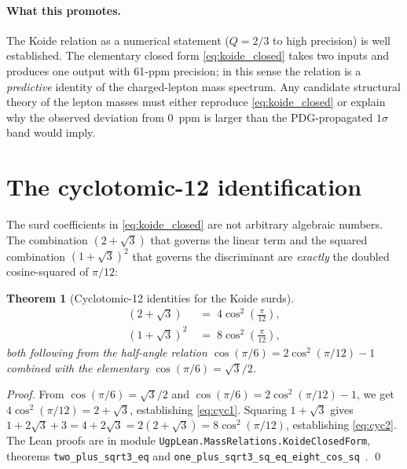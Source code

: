 \documentclass[11pt]{article}
\newtheorem{theorem}{Theorem}[section]
\theoremstyle{remark}
\begin{document}
\paragraph{What this promotes.}
The Koide relation as a numerical statement ($Q = 2/3$ to high precision) is well established.  The elementary closed form \eqref{eq:koide_closed} takes two inputs and produces one output with 61-ppm precision; in this sense the relation is a \emph{predictive} identity of the charged-lepton mass spectrum.  Any candidate structural theory of the lepton masses must either reproduce \eqref{eq:koide_closed} or explain why the observed deviation from $0$~ppm is larger than the PDG-propagated $1\sigma$ band would imply.

\section{The cyclotomic-12 identification}
\label{sec:cyclotomic}

The surd coefficients in \eqref{eq:koide_closed} are not arbitrary algebraic numbers.  The combination $(2 + \sqrt{3})$ that governs the linear term and the squared combination $(1 + \sqrt{3})^2$ that governs the discriminant are \emph{exactly} the doubled cosine-squared of $\pi/12$:

\begin{theorem}[Cyclotomic-12 identities for the Koide surds]
\label{thm:cyclotomic}
\begin{align}
(2 + \sqrt{3}) \;&=\; 4 \cos^2\!\left(\frac{\pi}{12}\right), \label{eq:cyc1}\\
(1 + \sqrt{3})^2 \;&=\; 8 \cos^2\!\left(\frac{\pi}{12}\right), \label{eq:cyc2}
\end{align}
both following from the half-angle relation $\cos(\pi/6) = 2\cos^2(\pi/12) - 1$ combined with the elementary $\cos(\pi/6) = \sqrt{3}/2$.
\end{theorem}

\noindent \emph{Proof.} From $\cos(\pi/6) = \sqrt{3}/2$ and $\cos(\pi/6) = 2\cos^2(\pi/12) - 1$, we get $4\cos^2(\pi/12) = 2 + \sqrt{3}$, establishing \eqref{eq:cyc1}.  Squaring $1 + \sqrt{3}$ gives $1 + 2\sqrt{3} + 3 = 4 + 2\sqrt{3} = 2(2 + \sqrt{3}) = 8\cos^2(\pi/12)$, establishing \eqref{eq:cyc2}.  The Lean proofs are in module \nolinkurl{UgpLean.MassRelations.KoideClosedForm}, theorems \nolinkurl{two_plus_sqrt3_eq} and \nolinkurl{one_plus_sqrt3_sq_eq_eight_cos_sq}~\cite{ugp-lean}. \qed
\end{document}
